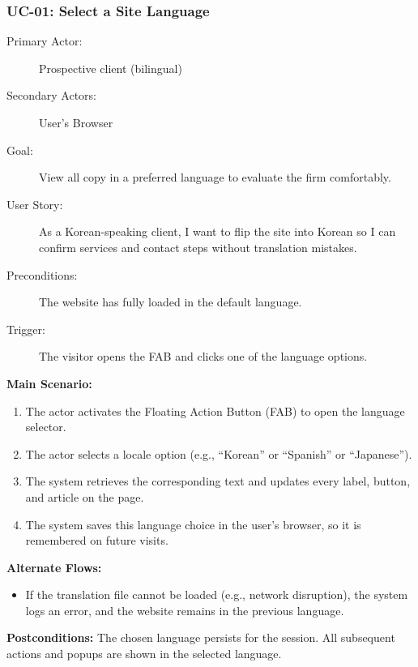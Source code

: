 \documentclass{article}
\begin{document}
\subsubsection{UC-01: Select a Site Language}\label{uc:01}
\begin{description}
  \item[Primary Actor:] Prospective client (bilingual)
  \item[Secondary Actors:] User's Browser
  \item[Goal:] View all copy in a preferred language to evaluate the firm comfortably.
  \item[User Story:] As a Korean-speaking client, I want to flip the site into Korean so I can confirm services and contact steps without translation mistakes.
  \item[Preconditions:] The website has fully loaded in the default language.
  \item[Trigger:] The visitor opens the FAB and clicks one of the language options.
\end{description}
\textbf{Main Scenario:}
\begin{enumerate}
  \item The actor activates the Floating Action Button (FAB) to open the language selector.
  \item The actor selects a locale option (e.g., ``Korean'' or ``Spanish'' or ``Japanese'').
  \item The system retrieves the corresponding text and updates every label, button, and article on the page.
  \item The system saves this language choice in the user's browser, so it is remembered on future visits.
\end{enumerate}
\textbf{Alternate Flows:}
\begin{itemize}
  \item If the translation file cannot be loaded (e.g., network disruption), the system logs an error, and the website remains in the previous language.
\end{itemize}
\textbf{Postconditions:} The chosen language persists for the session. All subsequent actions and popups are shown in the selected language.
\end{document}

